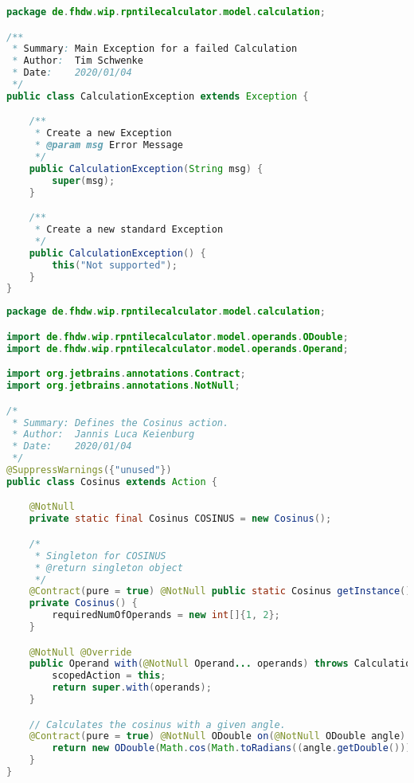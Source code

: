 \begin{lstlisting}[caption=CalculationException (Schwenke),label=list:CalculationException,language=Java]
package de.fhdw.wip.rpntilecalculator.model.calculation;

/**
 * Summary: Main Exception for a failed Calculation
 * Author:  Tim Schwenke
 * Date:    2020/01/04
 */
public class CalculationException extends Exception {

    /**
     * Create a new Exception
     * @param msg Error Message
     */
    public CalculationException(String msg) {
        super(msg);
    }

    /**
     * Create a new standard Exception
     */
    public CalculationException() {
        this("Not supported");
    }
}
\end{lstlisting}    

\begin{lstlisting}[caption=Cosinus (Keienburg),label=list:Cosinus,language=Java]
package de.fhdw.wip.rpntilecalculator.model.calculation;

import de.fhdw.wip.rpntilecalculator.model.operands.ODouble;
import de.fhdw.wip.rpntilecalculator.model.operands.Operand;

import org.jetbrains.annotations.Contract;
import org.jetbrains.annotations.NotNull;

/*
 * Summary: Defines the Cosinus action.
 * Author:  Jannis Luca Keienburg
 * Date:    2020/01/04
 */
@SuppressWarnings({"unused"})
public class Cosinus extends Action {

    @NotNull
    private static final Cosinus COSINUS = new Cosinus();

    /*
     * Singleton for COSINUS
     * @return singleton object
     */
    @Contract(pure = true) @NotNull public static Cosinus getInstance() { return COSINUS; }
    private Cosinus() {
        requiredNumOfOperands = new int[]{1, 2};
    }

    @NotNull @Override
    public Operand with(@NotNull Operand... operands) throws CalculationException {
        scopedAction = this;
        return super.with(operands);
    }

    // Calculates the cosinus with a given angle.
    @Contract(pure = true) @NotNull ODouble on(@NotNull ODouble angle) {
        return new ODouble(Math.cos(Math.toRadians((angle.getDouble()))));
    }
}
\end{lstlisting}    

